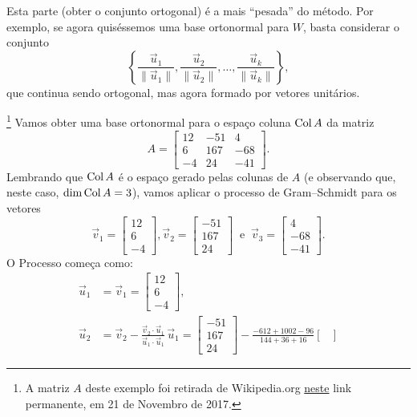 \documentclass[../livro.tex]{subfiles}  %
\begin{document}
Esta parte (obter o conjunto ortogonal) é a mais ``pesada'' do método. Por exemplo, se agora quiséssemos uma base ortonormal para $W$, basta considerar o conjunto
\[
\left\{ \frac{\vec{u}_1}{\|\vec{u}_1\|}, \frac{\vec{u}_2}{\|\vec{u}_2\|}, \dots, \frac{\vec{u}_k}{\|\vec{u}_k\|} \right\},
\] que continua sendo ortogonal, mas agora formado por vetores unitários.




\begin{example}\footnote{A matriz $A$ deste exemplo foi retirada de Wikipedia.org \href{https://en.wikipedia.org/w/index.php?title=QR_decomposition&oldid=810854220}{neste} link permanente, em 21 de Novembro de 2017.}
Vamos obter uma base ortonormal para o espaço coluna $\operatorname{Col} A$ da matriz
\[
A =
\begin{bmatrix}
12 & -51 & 4 \\
6 & 167 & -68 \\
-4 & 24 & -41
\end{bmatrix}.
\] Lembrando que $\operatorname{Col} A$ é o espaço gerado pelas colunas de $A$ (e observando que, neste caso, $\dim \operatorname{Col} A = 3$), vamos aplicar o processo de Gram--Schmidt para os vetores
\[
\vec{v}_1 =
\begin{bmatrix}
12 \\
6 \\
-4
\end{bmatrix},
\vec{v}_2 =
\begin{bmatrix}
 -51  \\
 167  \\
 24
\end{bmatrix} \ \text{ e } \ \vec{v}_3 =
\begin{bmatrix}
  4 \\
 -68 \\
 -41
\end{bmatrix}.
\] O Processo começa como:
\begin{align*}
\vec{u}_1 & = \vec{v}_1 =
\begin{bmatrix}
12 \\
6 \\
-4
\end{bmatrix}, \\
\vec{u}_2 &  = \vec{v}_2 - \frac{\vec{v}_2 \cdot \vec{u}_1}{\vec{u}_1 \cdot \vec{u}_1} \, \vec{u}_1 =
\begin{bmatrix}
 -51  \\
 167  \\
 24
\end{bmatrix} - \frac{-612 +1002 - 96}{144 + 36 + 16}
\begin{bmatrix}

\end{bmatrix}
\end{align*}
\end{example}
\end{document}
